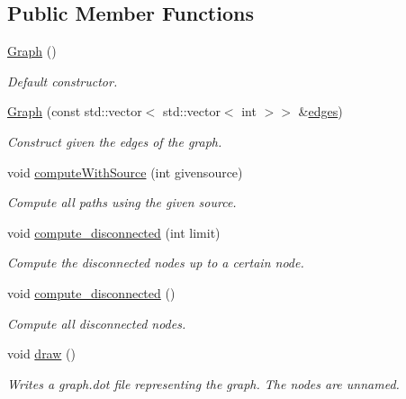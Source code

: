 \subsection*{Public Member Functions}
\begin{DoxyCompactItemize}
\item 
\hyperlink{classMackey_1_1Graph_a910e6687de1a1a90df5b656e3c850a01}{Graph} ()
\begin{DoxyCompactList}\small\item\em Default constructor. \end{DoxyCompactList}\item 
\hyperlink{classMackey_1_1Graph_a4f0ca7cec28645835bbad29b8c00992c}{Graph} (const std\+::vector$<$ std\+::vector$<$ int $>$$>$ \&\hyperlink{classMackey_1_1Graph_a729ec24b9f9e504f4c4e2d3f6e2cab83}{edges})
\begin{DoxyCompactList}\small\item\em Construct given the edges of the graph. \end{DoxyCompactList}\item 
void \hyperlink{classMackey_1_1Graph_acda32cd8d144dcd1ec771bd8d2753321}{compute\+With\+Source} (int givensource)
\begin{DoxyCompactList}\small\item\em Compute all paths using the given source. \end{DoxyCompactList}\item 
void \hyperlink{classMackey_1_1Graph_a939a62200b14892ba33a389363cd5f5e}{compute\+\_\+disconnected} (int limit)
\begin{DoxyCompactList}\small\item\em Compute the disconnected nodes up to a certain node. \end{DoxyCompactList}\item 
void \hyperlink{classMackey_1_1Graph_ab4042a555abac8c9c2009f07fbdbb4d5}{compute\+\_\+disconnected} ()
\begin{DoxyCompactList}\small\item\em Compute all disconnected nodes. \end{DoxyCompactList}\item 
void \hyperlink{classMackey_1_1Graph_ab88d38f2fa1822d415ce7dac272b32dc}{draw} ()
\begin{DoxyCompactList}\small\item\em Writes a graph.\+dot file representing the graph. The nodes are unnamed. \end{DoxyCompactList}\item 
$$
\end{DoxyCompactItemize}
